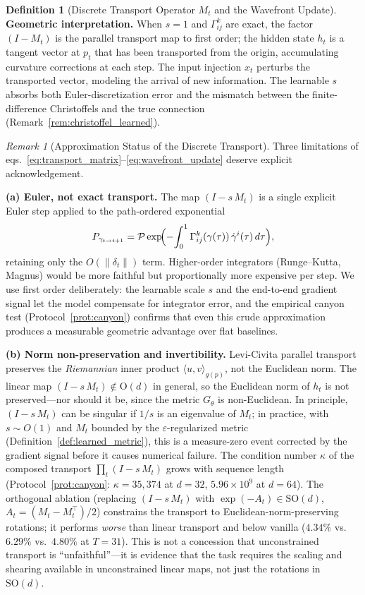 \documentclass[11pt,a4paper]{article}
\theoremstyle{definition}
\newtheorem{definition}[theorem]{Definition}
\theoremstyle{remark}
\newtheorem{remark}[theorem]{Remark}
\newcommand{\SO}{\mathrm{SO}}
\begin{document}
\begin{definition}[Discrete Transport Operator $M_t$ and 
the Wavefront Update]
\textbf{Geometric interpretation.} When $s = 1$ and 
$\Gamma^k_{ij}$ are exact, the factor $(I - M_t)$ is the parallel 
transport map to first order; the hidden state $h_t$ is a tangent 
vector at $p_t$ that has been transported from the origin, 
accumulating curvature corrections at each step. The input 
injection $x_t$ perturbs the transported vector, modeling the 
arrival of new information. The learnable $s$ absorbs both 
Euler-discretization error and the mismatch between the 
finite-difference Christoffels and the true connection 
(Remark~\ref{rem:christoffel_learned}).
\end{definition}

\begin{remark}[Approximation Status of the Discrete Transport]%
\label{rem:transport_approx}
Three limitations of eqs.~\eqref{eq:transport_matrix}--\eqref{eq:wavefront_update} 
deserve explicit acknowledgement.

\textbf{(a) Euler, not exact transport.}  
The map $(I - s\,M_t)$ is a single explicit Euler step applied to 
the path-ordered exponential
\[
  P_{\gamma_{t \to t+1}} = 
  \mathcal{P}\exp\!\Bigl(-\!\int_0^1 
  \Gamma^k_{ij}(\gamma(\tau))\,\dot\gamma^i(\tau)\,d\tau\Bigr),
\]
retaining only the $O(\|\delta_t\|)$ term. Higher-order 
integrators (Runge--Kutta, Magnus) would be more faithful but 
proportionally more expensive per step. We use first order 
deliberately: the learnable scale $s$ and the end-to-end gradient 
signal let the model compensate for integrator error, and the 
empirical canyon test (Protocol~\ref{prot:canyon}) confirms that 
even this crude approximation produces a measurable geometric 
advantage over flat baselines.

\textbf{(b) Norm non-preservation and invertibility.}  
Levi-Civita parallel transport preserves the \emph{Riemannian} 
inner product $\langle u, v \rangle_{g(p)}$, not the Euclidean 
norm. The linear map $(I - s\,M_t) \notin \mathrm{O}(d)$ in 
general, so the Euclidean norm of $h_t$ is not preserved---nor 
should it be, since the metric $G_\theta$ is non-Euclidean.
In principle, $(I - s\,M_t)$ can be singular if $1/s$ is an 
eigenvalue of $M_t$; in practice, with $s \sim O(1)$ and 
$M_t$ bounded by the $\varepsilon$-regularized metric 
(Definition~\ref{def:learned_metric}), this is a measure-zero 
event corrected by the gradient signal before it causes 
numerical failure.
The condition number $\kappa$ of the composed transport 
$\prod_t (I - s\,M_t)$ grows with sequence length 
(Protocol~\ref{prot:canyon}: $\kappa = 35{,}374$ at $d\!=\!32$, 
$5.96 \times 10^9$ at $d\!=\!64$). The orthogonal ablation 
(replacing $(I - s\,M_t)$ with $\exp(-A_t) \in \SO(d)$, 
$A_t = (M_t - M_t^\top)/2$) constrains the transport to 
Euclidean-norm-preserving rotations; it performs \emph{worse} 
than linear transport and below vanilla 
($4.34\%$ vs.\ $6.29\%$ vs.\ $4.80\%$ at $T\!=\!31$). 
This is not a concession that unconstrained transport is 
``unfaithful''---it is evidence that the task requires the 
scaling and shearing available in unconstrained linear maps, 
not just the rotations in~$\SO(d)$.


\end{remark}
\end{document}
